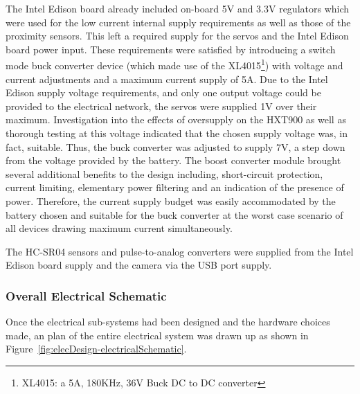       The Intel Edison board already included on-board 5V and 3.3V regulators which were used for the low current internal supply requirements as well as those of the proximity sensors. This left a required supply for the servos and the Intel Edison board power input. These requirements were satisfied by introducing a switch mode buck converter device (which made use of the XL4015\footnote{XL4015: a 5A, 180KHz, 36V Buck DC to DC converter}) with voltage and current adjustments and a maximum current supply of 5A. Due to the Intel Edison supply voltage requirements, and only one output voltage could be provided to the electrical network, the servos were supplied 1V over their maximum. Investigation into the effects of oversupply on the HXT900 as well as thorough testing at this voltage indicated that the chosen supply voltage was, in fact, suitable. Thus, the buck converter was adjusted to supply 7V, a step down from the voltage provided by the battery. The boost converter module brought several additional benefits to the design including, short-circuit protection, current limiting, elementary power filtering and an indication of the presence of power. Therefore, the current supply budget was easily accommodated by the battery chosen and suitable for the buck converter at the worst case scenario of all devices drawing maximum current simultaneously.
      
      The HC-SR04 sensors and pulse-to-analog converters were supplied from the Intel Edison board supply and the camera via the USB port supply.
    
    \subsubsection{Overall Electrical Schematic}
      Once the electrical sub-systems had been designed and the hardware choices made, an plan of the entire electrical system was drawn up as shown in Figure~\ref{fig:elecDesign-electricalSchematic}.
      
